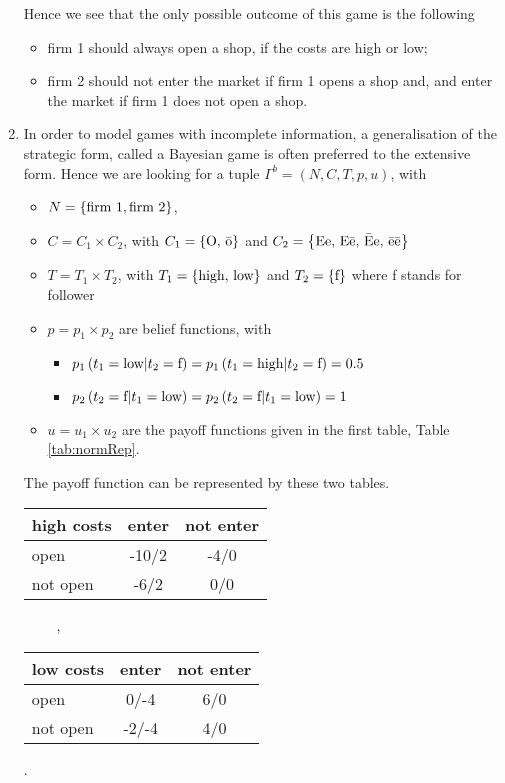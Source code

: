 \begin{enumerate}[label=\alph*.]
	      Hence we see that the only possible outcome of this game is the following
	      \begin{itemize}
	      	\item firm 1 should always open a shop, if the costs are high or low;
	      	\item firm 2 should not enter the market if firm 1 opens a shop and, and enter the market if firm 1 does not open a shop.
	      \end{itemize}

	\item In order to model games with incomplete information, a generalisation of the strategic form, called a Bayesian game is often preferred to the extensive form. Hence we are looking for a tuple $\Gamma^b = (N,C,T,p,u)$, with
	      \begin{itemize}
	      	\item $N = \left\{\text{firm 1}, \text{firm 2}\right\}$,
	      	\item $C = C_1 \times C_2$, with $C_1 = \left\{\text{O, \=o}\right\}$ and $C_2 = \left\{\text{Ee, E\=e, \=Ee, \=e\=e}\right\}$
	      	\item $T = T_1 \times T_2$, with $T_1 = \left\{\text{high, low}\right\}$ and $T_2 = \left\{\text{f}\right\}$ where f stands for follower
	      	\item $p = p_1 \times p_2$ are belief functions, with
	      	      \begin{itemize}
	      	      	\item $p_1 \left(t_1 = \text{low} | t_2 = \text{f}\right) = p_1 \left(t_1 = \text{high} | t_2 = \text{f}\right) = 0.5 $
	      	      	\item $p_2 \left( t_2 = \text{f} | t_1 = \text{low}\right) = p_2 \left( t_2 = \text{f} | t_1 = \text{low}\right) = 1 $
	      	      \end{itemize}
	      	\item $u = u_1 \times u_2$ are the payoff functions given in the first table, Table \ref{tab:normRep}.

	      \end{itemize}
				
				The payoff function can be represented by these two tables.
			 
			 \begin{center}
				 \begin{tabular}{l|cc}
					 		high costs & enter & not enter \\
					 		\hline
					 		open        & -10/2 & -4/0 \\
					 		not open    & -6/2  &  0/0 \\
				 \end{tabular}
				 $\qquad$
				 ,
				 $\qquad$
				 \begin{tabular}{l|cc}
					 		low costs & enter & not enter \\
					 		\hline
					 		open        & 0/-4  & 6/0 \\
					 		not open    & -2/-4 & 4/0 \\
				 \end{tabular}
				 .
			 \end{center}


\end{enumerate}
